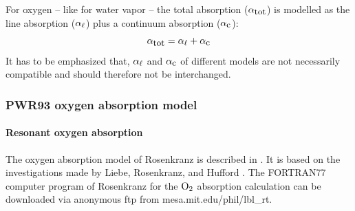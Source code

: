 For oxygen -- like for water vapor -- the total absorption 
($\alpha_{\mbox{\rm \small tot}}$) is modelled as the line absorption ($\alpha_{\ell}$) plus a  
continuum absorption ($\alpha_{\mbox{\small c}}$):
\begin{equation}
  \label{eq:abs_theory:o2:totabs}
  \alpha_{\mbox{\rm \small tot}} = \alpha_{\ell} + \alpha_{\mbox{\small c}}
\end{equation}
It has to be emphasized that, $\alpha_{\ell}$ and $\alpha_{\mbox{\small c}}$ of different
models are not necessarily compatible and should therefore not be interchanged.




\subsubsection{PWR93 oxygen absorption model}
\label{leveld:O2_pwr98}


\paragraph{Resonant oxygen absorption}
\label{levele:pwr93_o2lines}
The oxygen absorption model of Rosenkranz is described in \citet{pwr:93}. It 
is based on the investigations made by Liebe, Rosenkranz, and Hufford 
\citep{liebeetal:92}. The FORTRAN77 computer program of Rosenkranz for 
the $\mbox{O}_2$ absorption calculation can be downloaded via anonymous ftp from 
mesa.mit.edu/phil/lbl\_rt.

